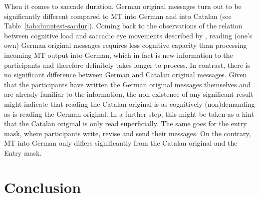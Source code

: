 \documentclass[output=paper,colorlinks,citecolor=brown]{langscibook}
\begin{document}
When it comes to saccade duration, German original messages turn out to be significantly different compared to MT into German and into Catalan (see Table~\ref{tab:dunntest-sacdur}). Coming back to the observations of the relation between cognitive load and saccadic eye movements described by \citet[313f.]{holmqvist_eye_2011}, reading (one's own) German original messages requires less cognitive capacity than processing incoming MT output into German, which in fact is new information to the participants and therefore definitely takes longer to process. In contrast, there is no significant difference between German and Catalan original messages. Given that the participants have written the German original messages themselves and are already familiar to the information, the non-existence of any significant result might indicate that reading the Catalan original is as cognitively (non)demanding as is reading the German original. In a further step, this might be taken as a hint that the Catalan original is only read superficially. The same goes for the entry mask, where participants write, revise and send their messages. On the contrary, MT into German only differs significantly from the Catalan original and the Entry mask.


\section{Conclusion}
\label{hoberg:conclusion}

\end{document}
